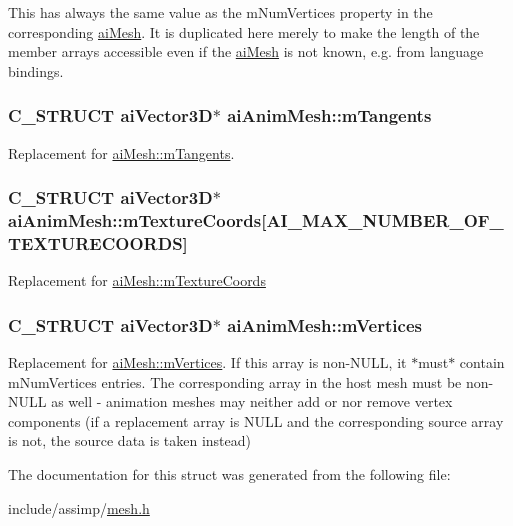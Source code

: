 \-This has always the same value as the m\-Num\-Vertices property in the corresponding \hyperlink{structaiMesh}{ai\-Mesh}. \-It is duplicated here merely to make the length of the member arrays accessible even if the \hyperlink{structaiMesh}{ai\-Mesh} is not known, e.\-g. from language bindings. \hypertarget{structaiAnimMesh_a95dcc49c6d5ecc570ceb54552a0a9625}{
\subsubsection[{m\-Tangents}]{\setlength{\rightskip}{0pt plus 5cm}\-C\-\_\-\-S\-T\-R\-U\-C\-T {\bf ai\-Vector3\-D}$\ast$ {\bf ai\-Anim\-Mesh\-::m\-Tangents}}}\label{structaiAnimMesh_a95dcc49c6d5ecc570ceb54552a0a9625}
\-Replacement for \hyperlink{structaiMesh_af367ff78bd69f3e83d7edc8ad67dc5df}{ai\-Mesh\-::m\-Tangents}. \hypertarget{structaiAnimMesh_ad24a0451adeb845a53eb2351b9462e0a}{
\subsubsection[{m\-Texture\-Coords}]{\setlength{\rightskip}{0pt plus 5cm}\-C\-\_\-\-S\-T\-R\-U\-C\-T {\bf ai\-Vector3\-D}$\ast$ {\bf ai\-Anim\-Mesh\-::m\-Texture\-Coords}\mbox{[}{\bf \-A\-I\-\_\-\-M\-A\-X\-\_\-\-N\-U\-M\-B\-E\-R\-\_\-\-O\-F\-\_\-\-T\-E\-X\-T\-U\-R\-E\-C\-O\-O\-R\-D\-S}\mbox{]}}}\label{structaiAnimMesh_ad24a0451adeb845a53eb2351b9462e0a}
\-Replacement for \hyperlink{structaiMesh_a4a50b11d00ef50f419c75cab0f6bddd6}{ai\-Mesh\-::m\-Texture\-Coords} \hypertarget{structaiAnimMesh_a0ac2dd4c1afd23e6a9293b1d0ded3060}{
\subsubsection[{m\-Vertices}]{\setlength{\rightskip}{0pt plus 5cm}\-C\-\_\-\-S\-T\-R\-U\-C\-T {\bf ai\-Vector3\-D}$\ast$ {\bf ai\-Anim\-Mesh\-::m\-Vertices}}}\label{structaiAnimMesh_a0ac2dd4c1afd23e6a9293b1d0ded3060}
\-Replacement for \hyperlink{structaiMesh_afd4588abb3e1c72821ae0234a3850662}{ai\-Mesh\-::m\-Vertices}. \-If this array is non-\/\-N\-U\-L\-L, it $\ast$must$\ast$ contain m\-Num\-Vertices entries. \-The corresponding array in the host mesh must be non-\/\-N\-U\-L\-L as well -\/ animation meshes may neither add or nor remove vertex components (if a replacement array is \-N\-U\-L\-L and the corresponding source array is not, the source data is taken instead) 

\-The documentation for this struct was generated from the following file\-:\begin{DoxyCompactItemize}
\item 
include/assimp/\hyperlink{mesh_8h}{mesh.\-h}\end{DoxyCompactItemize}

